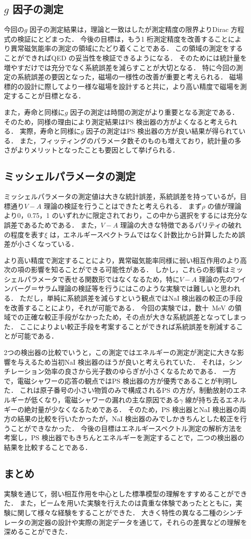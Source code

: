 \subsection{$g$ 因子の測定}
今回の$g$ 因子の測定結果は，理論と一致はしたが測定精度の限界よりDirac 方程式の検証にとどまった．
今後の目標は，もう1 桁測定精度を改善することにより異常磁気能率の測定の領域にたどり着くことである．
この領域の測定をすることができればQED の妥当性を検証できるようになる．
そのためには統計量を増やすだけでは充分でなく系統誤差を減らすことが大切となる．
特に今回の測定の系統誤差の要因となった，磁場の一様性の改善が重要と考えられる．
磁場標的の設計に際してより一様な磁場を設計すると共に，より高い精度で磁場を測定することが目標となる．

また，寿命と同様に$g$ 因子の測定は時間の測定がより重要となる測定である．
そのため，同様の理由により測定結果はPS 検出器の方がよくなると考えられる．
実際，寿命と同様に$g$ 因子の測定はPS 検出器の方が良い結果が得られている．
また，フィッティングのパラメータ数そのものも増えており，統計量の多さがよりメリットとなったことも要因として挙げられる．

\subsection{ミッシェルパラメータの測定}
ミッシェルパラメータの測定値は大きな統計誤差，系統誤差を持っているが，目標通り$V-A$ 理論の検証を行うことはできたと考えられる．
まず$\rho$ の値が理論より0，0.75，1 のいずれかに限定されており，この中から選択をするには充分な誤差であるためである．
また，$V-A$ 理論の大きな特徴であるパリティの破れの程度を表す$\xi$ は，エネルギースペクトラムではなく計数比から計算したため誤差が小さくなっている．

より高い精度で測定することにより，異常磁気能率同様に弱い相互作用のより高次の項の影響を知ることができる可能性がある．
しかし，これらの影響はミッシェルパラメータで表せる関数形ではなくなるため，特に$V-A$ 理論の先のワインバーグ＝サラム理論の検証等を行うにはこのような実験では難しいと思われる．
ただし，単純に系統誤差を減らすという観点ではNaI 検出器の較正の手段を改善することにより，それが可能である．
今回の実験では，数十~MeV の領域での正確な較正手段がなかったため，その点が大きな系統誤差となってしまった．
ここによりよい較正手段を考案することができれば系統誤差を削減することが可能である．

2つの検出器の比較でいうと，この測定ではエネルギーの測定が測定に大きな影響を与えるため当初NaI 検出器のほうが良いと考えられていた．
それは，シンチレーション効率の良さから光子数のゆらぎが小さくなるためである．
一方で，電磁シャワーの応答の観点ではPS 検出器の方が優秀であることが判明した．
これは原子番号の小さい物質のみで構成されるPS の方が，制動放射のエネルギーが低くなり，電磁シャワーの漏れの主な原因である$\gamma$ 線が持ち去るエネルギーの絶対量が少なくなるためである．
そのため，PS 検出器とNaI 検出器の両方の結果の比較を行いたかったが，NaI 検出器のみでしかきちんとした較正を行うことができなかった．
今後の目標はエネルギースペクトル測定の解析方法を考案し，PS 検出器でもきちんとエネルギーを測定することで，二つの検出器の結果を比較することである．

\subsection{まとめ}
実験を通じて，弱い相互作用を中心とした標準模型の理解をすすめることができた．
また，ビームを用いた実験を行えたのは貴重な体験であったとともに，実験に関して様々な経験をすることができた．
大きく特性の異なる二種のシンチレータの測定器の設計や実際の測定データを通じて，それらの差異などの理解を深めることができた．
